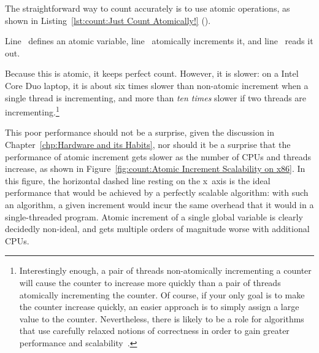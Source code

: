 The straightforward way to count accurately is to use atomic operations,
as shown in
Listing~\ref{lst:count:Just Count Atomically!} ().
\begin{fcvref}
Line~ defines an atomic variable,
line~ atomically increments it, and
line~ reads it out.
\end{fcvref}
Because this is atomic, it keeps perfect count.
However, it is slower: on a Intel Core Duo laptop, it is about
six times slower than non-atomic increment
when a single thread is incrementing, and more than \emph{ten times}
slower if two threads are incrementing.\footnote{
	Interestingly enough, a pair of threads non-atomically incrementing
	a counter will cause the counter to increase more quickly than
	a pair of threads atomically incrementing the counter.
	Of course, if your only goal is to make the counter increase
	quickly, an easier approach is to simply assign a large value
	to the counter.
	Nevertheless, there is likely to be a role for algorithms that
	use carefully relaxed notions of correctness in order to gain
	greater performance and
	scalability~\cite{Andrews91textbook,Arcangeli03,DavidUngar2011unsync}.}

This poor performance should not be a surprise, given the discussion in
Chapter~\ref{chp:Hardware and its Habits},
nor should it be a surprise that the performance of atomic increment
gets slower as the number of CPUs and threads increase, as shown in
Figure~\ref{fig:count:Atomic Increment Scalability on x86}.
In this figure, the horizontal dashed line resting on the x~axis
is the ideal performance that would be achieved
by a perfectly scalable algorithm: with such an algorithm, a given
increment would incur the same overhead that it would in a single-threaded
program.
Atomic increment of a single global variable is clearly
decidedly non-ideal, and gets multiple orders of magnitude worse with
additional CPUs.

